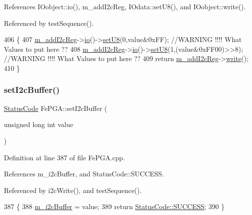 References I\+Oobject\+::io(), m\+\_\+add\+I2c\+Reg, I\+Odata\+::set\+U8(), and I\+Oobject\+::write().



Referenced by test\+Sequence().


\begin{DoxyCode}
406                                                     \{
407   \hyperlink{classFePGA_af3ef3467ba803e6d3b970ea8982d6246}{m\_addI2cReg}->\hyperlink{classIOobject_af04fb94137c3d86849f478ac5afab5d1}{io}()->\hyperlink{classIOdata_a6c4fb2f2af01889ada889c2b7aceb24d}{setU8}(0,value&0xFF); \textcolor{comment}{//WARNING !!!! What Values to put here ??}
408   \hyperlink{classFePGA_af3ef3467ba803e6d3b970ea8982d6246}{m\_addI2cReg}->\hyperlink{classIOobject_af04fb94137c3d86849f478ac5afab5d1}{io}()->\hyperlink{classIOdata_a6c4fb2f2af01889ada889c2b7aceb24d}{setU8}(1,(value&0xFF00)>>8); \textcolor{comment}{//WARNING !!!! What Values to put here
       ??}
409   \textcolor{keywordflow}{return} \hyperlink{classFePGA_af3ef3467ba803e6d3b970ea8982d6246}{m\_addI2cReg}->\hyperlink{classIOobject_a9f6984bc9f0fadcf800f1be2523ac744}{write}();
410 \}
\end{DoxyCode}
\mbox{\label{classFePGA_aaf52ed549f6b79d53f49c3f85c5fbad2}} 
\subsubsection{\texorpdfstring{set\+I2c\+Buffer()}{setI2cBuffer()}}
{\footnotesize\ttfamily \hyperlink{classStatusCode}{Status\+Code} Fe\+P\+G\+A\+::set\+I2c\+Buffer (\begin{DoxyParamCaption}\item[{unsigned long int}]{value }\end{DoxyParamCaption})}



Definition at line 387 of file Fe\+P\+G\+A.\+cpp.



References m\+\_\+i2c\+Buffer, and Status\+Code\+::\+S\+U\+C\+C\+E\+SS.



Referenced by i2c\+Write(), and test\+Sequence().


\begin{DoxyCode}
387                                                        \{
388   \hyperlink{classFePGA_a173664ffd6a73f454ae31f51e689dd16}{m\_i2cBuffer} = value;
389   \textcolor{keywordflow}{return} \hyperlink{classStatusCode_a6f565cbeadc76d14c72f047e5e85eb4badd0da38d3ba0d922efd1f4619bc37ad8}{StatusCode::SUCCESS};
390 \}
\end{DoxyCode}
\mbox{\label{classFePGA_ac9a16de5f01fda901494abe61efb5029}} 
